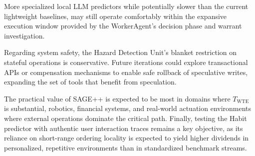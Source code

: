 \documentclass[conference]{IEEEtran}
\newcommand{\twte}{T_{\mathrm{WTE}}}   %
\begin{document}
More specialized local LLM predictors while potentially slower than the current lightweight baselines, may still operate comfortably within the expansive execution window provided by the WorkerAgent's decision phase and warrant investigation.

Regarding system safety, the Hazard Detection Unit's blanket restriction on stateful operations is conservative.
Future iterations could explore transactional APIs or compensation mechanisms to enable safe rollback of speculative writes, expanding the set of tools that
benefit from speculation.

The practical value of SAGE++ is expected to be most in domains where $\twte$ is substantial, robotics, financial systems, and real-world actuation environments where external operations dominate the critical path.
Finally, testing the Habit predictor with authentic user interaction traces remains a key objective, as its reliance on short-range ordering locality is expected to yield higher dividends in personalized, repetitive environments than
in standardized benchmark streams.
\end{document}
